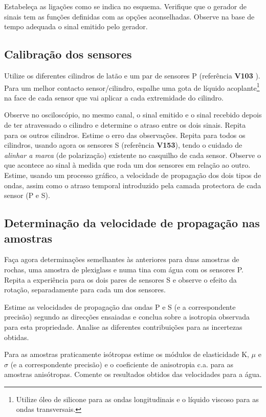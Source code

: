 \documentclass[a4paper,12pt]{article}
\begin{document}
 Estabeleça as ligações como se indica no esquema. Verifique que o gerador de sinais tem as funções definidas com as opções aconselhadas.
Observe na base de tempo adequada o sinal emitido pelo gerador.

\subsection{\sf Calibração dos sensores}
Utilize os diferentes cilindros de latão e um par de sensores P (referência \textbf{V103} ). Para um melhor contacto sensor/cilindro, espalhe uma gota de líquido acoplante\footnote{Utilize óleo de silicone para as ondas longitudinais e o líquido viscoso para as ondas transversais.} na face de cada sensor que vai aplicar a cada extremidade do cilindro.

Observe no osciloscópio, no mesmo canal, o sinal emitido e o sinal recebido depois de ter atravessado o cilindro e determine o atraso entre os dois sinais. Repita para os outros cilindros. Estime o erro das observações.
Repita para todos os cilindros, usando agora os sensores S (referência  \textbf{V153}), tendo o cuidado de  \emph{alinhar a marca}  (de polarização) existente no casquilho de cada sensor. 
Observe o que acontece ao sinal à medida que roda um dos sensores em relação ao outro.
Estime, usando um processo gráfico, a velocidade de propagação dos dois tipos de ondas, assim como o atraso temporal introduzido pela camada protectora de cada sensor (P e S).

\subsection{\sf Determinação da velocidade de propagação nas amostras}
Faça agora determinações semelhantes às anteriores para duas amostras de rochas, uma amostra de plexiglass e numa tina com água  com os sensores P. Repita a experiência para os dois pares de sensores S e observe o efeito da rotação, separadamente para cada um dos sensores.

Estime as velocidades de propagação das ondas P e S (e a correspondente precisão) segundo as direcções ensaiadas e conclua sobre a isotropia observada para esta propriedade. Analise as diferentes contribuições para as incertezas obtidas.

Para as amostras praticamente isótropas estime os módulos de elasticidade K, $\mu$ e $\sigma$ (e a correspondente precisão) e o coeficiente de anisotropia c.a. para as amostras anisótropas.
Comente os resultados obtidos das velocidades para a água.
\end{document}
